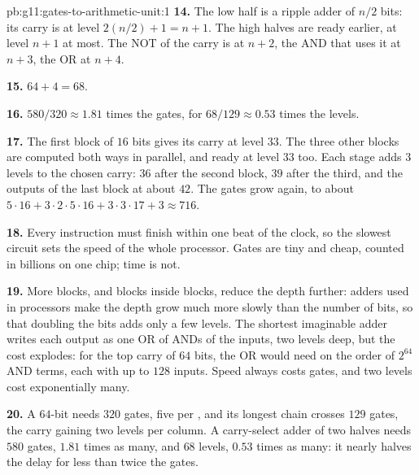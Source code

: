 \begin{solution}{pb:g11:gates-to-arithmetic-unit:1}
\textbf{14.} The low half is a ripple adder of $n/2$ bits: its carry is at level $2(n/2) + 1 = n + 1$. The high halves
are ready earlier, at level $n + 1$ at most. The NOT of the carry is at $n + 2$, the AND that uses it at $n + 3$, the
OR at $n + 4$.

\textbf{15.} $64 + 4 = 68$.

\textbf{16.} $580/320 \approx 1.81$ times the gates, for $68/129 \approx 0.53$ times the levels.

\textbf{17.} The first block of $16$ bits gives its carry at level $33$. The three other blocks are computed both ways
in parallel, and ready at level $33$ too. Each  stage adds $3$ levels to the chosen carry: $36$ after the
second block, $39$ after the third, and the outputs of the last block at about $42$. The gates grow again, to about
$5 \cdot 16 + 3 \cdot 2 \cdot 5 \cdot 16 + 3 \cdot 3 \cdot 17 + 3 \approx 716$.

\textbf{18.} Every instruction must finish within one beat of the clock, so the slowest circuit sets the speed of the
whole processor. Gates are tiny and cheap, counted in billions on one chip; time is not.

\textbf{19.} More blocks, and blocks inside blocks, reduce the depth further: adders used in processors make the
depth grow much more slowly than the number of bits, so that doubling the bits adds only a few levels. The shortest
imaginable adder writes each output as one OR of ANDs of the inputs, two levels deep, but the cost explodes: for the
top carry of $64$ bits, the OR would need on the order of $2^{64}$ AND terms, each with up to $128$ inputs. Speed always
costs gates, and two levels cost exponentially many.

\textbf{20.} A $64$-bit  needs $320$ gates, five per , and its longest chain crosses
$129$ gates, the carry gaining two levels per column. A carry-select adder of two halves needs $580$ gates, $1.81$
times as many, and $68$ levels, $0.53$ times as many: it nearly halves the delay for less than twice the gates.
\end{solution}
